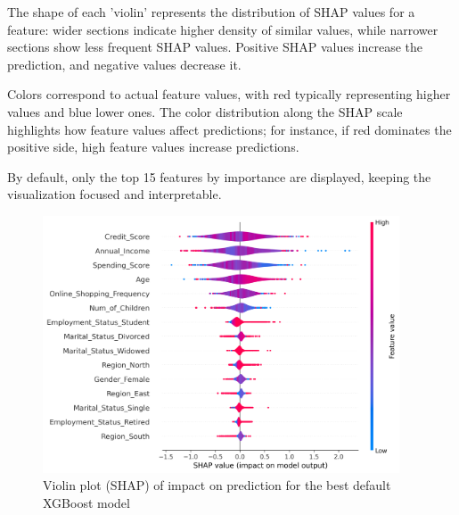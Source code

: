 \documentclass{article}%
\begin{document}
        \hspace{20px}The shape of each 'violin' represents the distribution of SHAP values for a feature: wider sections indicate higher density of similar values, 
        while narrower sections show less frequent SHAP values. Positive SHAP values increase the prediction, and negative values decrease it.

        \hspace{20px} Colors correspond to actual feature values, with red typically representing higher values and blue lower ones.
        The color distribution along the SHAP scale highlights how feature values affect predictions; for instance, 
        if red dominates the positive side, high feature values increase predictions.

        \hspace{10px} By default, only the top 15 features by importance are displayed, keeping the visualization focused and interpretable.\\


\begin{figure}[h!]%
\centering%
\includegraphics[width=400px]{XAI/XGBoost/violin_summary_plot_shap.png}%
\caption{Violin plot (SHAP) of impact on prediction for the best default XGBoost model}%
\end{figure}

%
\end{document}
